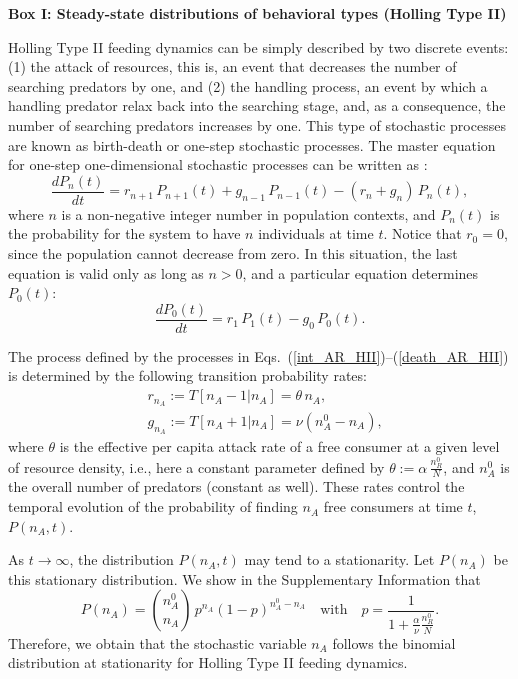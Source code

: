 \begin{tcolorbox}\label{cha:box1}
\noindent \textbf{Box I: Steady-state distributions of behavioral types (Holling Type II)\smallskip}

\noindent Holling Type II feeding dynamics can be simply described by two discrete events: (1) the attack of resources, this is, an event that decreases the number of searching predators by one, and (2) the handling process, an event by which a handling predator relax back into the searching stage, and, as a consequence, the number of searching predators increases by one. This type of stochastic processes are known as birth-death or one-step stochastic processes. The master equation for one-step one-dimensional stochastic processes can be written as \citep{vankampen2011}:
\begin{equation*}
	\frac{d P_n(t)}{d t} = r_{n+1}\,P_{n+1}(t) + g_{n-1}\,P_{n-1}(t) -(r_n + g_n)\,P_n(t),
\end{equation*}
where $n$ is a non-negative integer number in population contexts, and $P_n(t)$ is the probability for the system to have $n$ individuals at time $t$. Notice that $r_0 = 0$, since the population cannot decrease from zero. In this situation, the last equation is valid only as long as $n>0$, and a particular equation determines $P_0(t)$:  
\begin{equation*}
\frac{dP_0(t)}{dt} = r_{1}\,P_1(t) - g_0\,P_0(t).
\end{equation*}

The process defined by the processes in Eqs.~(\ref{int_AR_HII})--(\ref{death_AR_HII}) is determined by the following transition probability rates:
\begin{align*}
&r_{n_A}:=T[n_A-1 | n_A]= \theta \,n_A,\\
&g_{n_A}:=T[n_A+1 | n_A ]= \nu (n_A^0 - n_A),
\end{align*}
where $\theta$ is the effective per capita attack rate of a free consumer at a given level of resource density, i.e., here a constant parameter defined by $\theta:=\alpha\,\frac{n_R^0}{N}$, and $n_A^0$ is the overall number of predators (constant as well). These rates control the temporal evolution of the probability of finding $n_A$ free consumers at time $t$, $P(n_A,t)$.

As $t \rightarrow \infty$, the distribution $P(n_A,t)$ may tend to a stationarity. Let $P(n_A)$ be this stationary distribution. We show in the Supplementary Information that
\begin{equation}
    P(n_A) = \binom{n_A^0}{n_A}\,p^{n_A}(1-p)^{n_A^0-n_A} \quad\text{with}\quad
    p = \frac{1}{1 + \frac{\alpha}{\nu} \frac{n_R^0}{N}}.\tag{B1}
    \label{eq:binom}
\end{equation}
Therefore, we obtain that the stochastic variable $n_A$ follows the binomial distribution at stationarity for Holling Type II feeding dynamics.
\end{tcolorbox}

